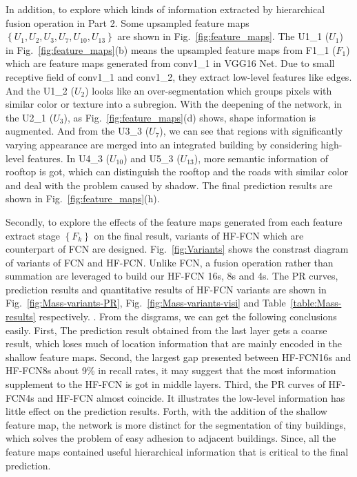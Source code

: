In addition, to explore which kinds of information extracted by hierarchical fusion operation in Part 2.
Some upsampled feature maps ${\left\{U_1,U_2,U_3,U_7,U_{10},U_{13}\right\}}$ are shown in Fig.~\ref{fig:feature_maps}.
The U1\_1 (${U_1}$) in Fig.~\ref{fig:feature_maps}(b) means the upsampled feature maps from F1\_1 (${F_1}$) which are feature maps generated from conv1\_1 in VGG16 Net.
Due to small receptive field of conv1\_1 and conv1\_2, they extract low-level features like edges.
And the U1\_2 (${U_2}$) looks like an over-segmentation which groups pixels with similar color or texture into a subregion.
With the deepening of the network, in the U2\_1 (${U_3}$), as Fig.~\ref{fig:feature_maps}(d) shows, shape information is augmented.
And from the U3\_3 (${U_7}$), we can see that regions with significantly varying appearance are merged into an integrated building by considering high-level features.
In U4\_3 (${U_{10}}$) and U5\_3 ($U_{13}$), more semantic information of rooftop is got, which can distinguish the rooftop and the roads with similar color and deal with the problem caused by shadow.
The final prediction results are shown in Fig.~\ref{fig:feature_maps}(h).

Secondly, to explore the effects of the feature maps generated from each feature extract stage ${\left\{F_k\right\}}$ on the final result, variants of HF-FCN which are counterpart of FCN are designed.
Fig.~\ref{fig:Variants} shows the constrast diagram of variants of FCN and HF-FCN.
Unlike FCN, a fusion operation rather than summation are leveraged to build our HF-FCN 16s, 8s and 4s.
The PR curves, prediction results and quantitative results of HF-FCN variants are shown in Fig.~\ref{fig:Mass-variants-PR}, Fig.~\ref{fig:Mass-variants-visi} and Table~\ref{table:Mass-results} respectively. .
From the disgrams, we can get the following conclusions easily. 
First, The prediction result obtained from the last layer gets a coarse result, which loses much of location information that are mainly encoded in the shallow feature maps. Second, the largest gap presented between HF-FCN16s and HF-FCN8s about 9{\%} in recall rates, it may suggest that the most information supplement to the HF-FCN is got in middle layers. Third, the PR curves of HF-FCN4s and HF-FCN almost coincide. It illustrates the low-level information has little effect on the prediction results. Forth, with the addition of the shallow feature map, the network is more distinct for the segmentation of tiny buildings, which solves the problem of easy adhesion to adjacent buildings. 
Since, all the feature maps contained useful hierarchical information that is critical to the final prediction.

